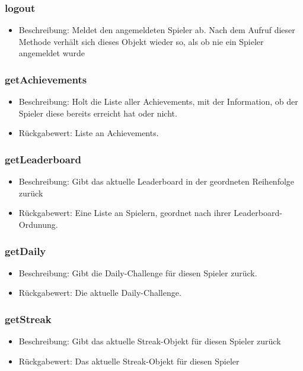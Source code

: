 \documentclass[a4paper]{scrreprt}
\begin{document}
	\subsubsection{logout}
	\begin{itemize}
		\item Beschreibung: Meldet den angemeldeten Spieler ab. Nach dem Aufruf dieser Methode verhält sich dieses Objekt wieder so, als ob nie ein Spieler angemeldet wurde
	\end{itemize}
	\subsubsection{getAchievements}
	\begin{itemize}
		\item Beschreibung: Holt die Liste aller Achievements, mit der Information, ob der Spieler diese bereits erreicht hat oder nicht.
		\item Rückgabewert: Liste an Achievements.
	\end{itemize}
	\subsubsection{getLeaderboard}
	\begin{itemize}
		\item Beschreibung: Gibt das aktuelle Leaderboard in der geordneten Reihenfolge zurück
		\item Rückgabewert: Eine Liste an Spielern, geordnet nach ihrer Leaderboard-Ordunung.
	\end{itemize}
	\subsubsection{getDaily}
	\begin{itemize}
		\item Beschreibung: Gibt die Daily-Challenge für diesen Spieler zurück.
		\item Rückgabewert: Die aktuelle Daily-Challenge.
	\end{itemize}
	\subsubsection{getStreak}
	\begin{itemize}
		\item Beschreibung: Gibt das aktuelle Streak-Objekt für diesen Spieler zurück
		\item Rückgabewert: Das aktuelle Streak-Objekt für diesen Spieler
	\end{itemize}
\end{document}
